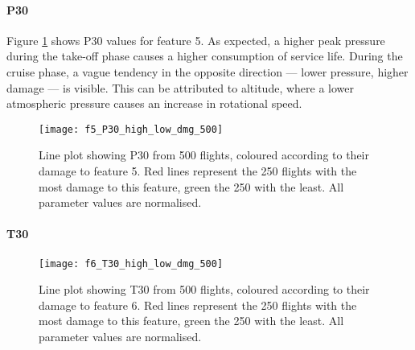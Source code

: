 \paragraph*{P30}
Figure \ref{fig:high_low_dmg_P30} shows P30 values for feature 5. As expected, a higher peak pressure during the take-off phase causes a higher consumption of service life. During the cruise phase, a vague tendency in the opposite direction --- lower pressure, higher damage --- is visible. This can be attributed to altitude, where a lower atmospheric pressure causes an increase in rotational speed.

\begin{figure}[tb!]
    \centering
    \texttt{[image: f5\_P30\_high\_low\_dmg\_500]}
    \caption{\label{fig:high_low_dmg_P30} Line plot showing P30 from 500 flights, coloured according to their damage to feature 5. Red lines represent the 250 flights with the most damage to this feature, green the 250 with the least. All parameter values are normalised.}
\end{figure}



\paragraph*{T30}
\begin{figure}[tb!]
    \centering
    \texttt{[image: f6\_T30\_high\_low\_dmg\_500]}
    \caption{\label{fig:high_low_dmg_T30} Line plot showing T30 from 500 flights, coloured according to their damage to feature 6. Red lines represent the 250 flights with the most damage to this feature, green the 250 with the least. All parameter values are normalised.}
\end{figure}

